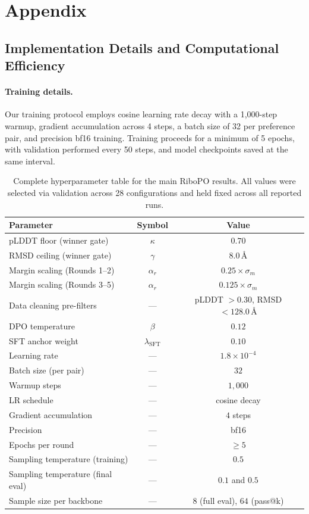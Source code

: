 \newpage
\appendix
\section{Appendix}

\subsection{Implementation Details and Computational Efficiency}
\label{subsec:implementation}

\paragraph{Training details.} Our training protocol employs cosine learning rate decay with a 1,000-step warmup, gradient accumulation across 4 steps, a batch size of 32 per preference pair, and precision bf16 training. Training proceeds for a minimum of 5 epochs, with validation performed every 50 steps, and model checkpoints saved at the same interval.

\begin{table}[h]
\centering
\caption{Complete hyperparameter table for the main RiboPO results. All values were selected via validation across 28 configurations and held fixed across all reported runs.}
\label{tab:hparams}
\small
\begin{tabular}{lcc}
\toprule
\textbf{Parameter} & \textbf{Symbol} & \textbf{Value} \\
\midrule
pLDDT floor (winner gate) & $\kappa$ & $0.70$ \\
RMSD ceiling (winner gate) & $\gamma$ & $8.0\,\text{\AA}$ \\
Margin scaling (Rounds 1--2) & $\alpha_r$ & $0.25 \times \sigma_m$ \\
Margin scaling (Rounds 3--5) & $\alpha_r$ & $0.125 \times \sigma_m$ \\
Data cleaning pre-filters & --- & pLDDT $> 0.30$, RMSD $< 128.0\,\text{\AA}$ \\
DPO temperature & $\beta$ & $0.12$ \\
SFT anchor weight & $\lambda_{\text{SFT}}$ & $0.10$ \\
Learning rate & --- & $1.8 \times 10^{-4}$ \\
Batch size (per pair) & --- & $32$ \\
Warmup steps & --- & $1{,}000$ \\
LR schedule & --- & cosine decay \\
Gradient accumulation & --- & $4$ steps \\
Precision & --- & bf16 \\
Epochs per round & --- & $\geq 5$ \\
Sampling temperature (training) & --- & $0.5$ \\
Sampling temperature (final eval) & --- & $0.1$ and $0.5$ \\
Sample size per backbone & --- & $8$ (full eval), $64$ (pass@k) \\
\bottomrule
\end{tabular}
\end{table}

